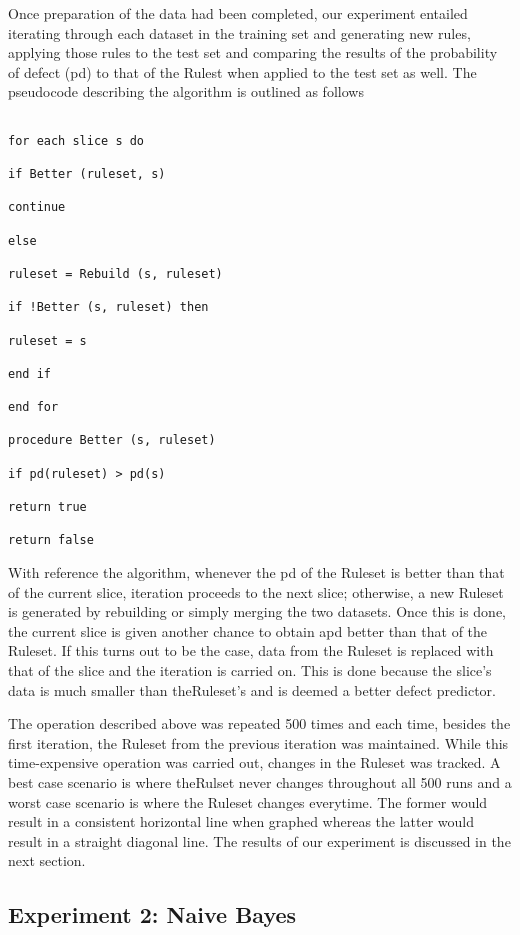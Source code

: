 \documentclass{sig-alternate}
\begin{document}
Once preparation of the data had been completed, our experiment entailed iterating through each dataset in the training set and generating new rules, applying those rules to the test set and comparing the results of the probability of defect (pd) to that of the Rulest when applied to the test set as well. The pseudocode describing the algorithm is outlined as follows

\begin{verbatim}

for each slice s do

if Better (ruleset, s)

continue

else

ruleset = Rebuild (s, ruleset)

if !Better (s, ruleset) then

ruleset = s

end if

end for

procedure Better (s, ruleset)

if pd(ruleset) > pd(s)

return true

return false

\end{verbatim}

With reference the algorithm, whenever the pd of the Ruleset is better than that of the current slice, iteration proceeds to the next slice; otherwise, a new Ruleset is generated by rebuilding or simply merging the two datasets. Once this is done, the current slice is given another chance to obtain apd better than that of the Ruleset. If this turns out to be the case, data from the Ruleset is replaced with that of the slice and the iteration is carried on. This is done because the slice's data is much smaller than theRuleset's and is deemed a better defect predictor.

The operation described above was repeated 500 times and each time, besides the first iteration, the Ruleset from the previous iteration was maintained. While this time-expensive operation was carried out, changes in the Ruleset was tracked. A best case scenario is where theRulset never changes throughout all 500 runs and a worst case scenario is where the Ruleset changes everytime. The former would result in a consistent horizontal line when graphed whereas the latter would result in a straight diagonal line. The results of our experiment is discussed in the next section.

\subsection{Experiment 2: Naive Bayes}
\end{document}
